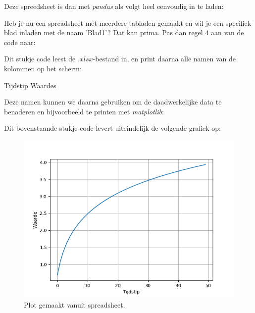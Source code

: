 \newpage

Deze spreedsheet is dan met \textit{pandas} als volgt heel eenvoudig in te laden:

\begin{remark}
Heb je nu een spreadsheet met meerdere tabladen gemaakt en wil je een specifiek blad inladen met de naam 'Blad1'? Dat kan prima. Pas dan regel $4$ aan van de code naar: \\
\end{remark}

Dit stukje code leest de $.xlsx$-bestand in, en print daarna alle namen van de kolommen op het scherm:
\begin{python}
Tijdstip
Waardes
\end{python}

Deze namen kunnen we daarna gebruiken om de daadwerkelijke data te benaderen en bijvoorbeeld te printen met \textit{matplotlib}:


Dit bovenstaande stukje code levert uiteindelijk de volgende grafiek op:

\begin{figure}[h!]
\centering\includegraphics[scale=0.7]{Pictures/chapter07/plot3.png}
\caption{Plot gemaakt vanuit spreadsheet.}
\label{fig:plot3} %
\end{figure}


